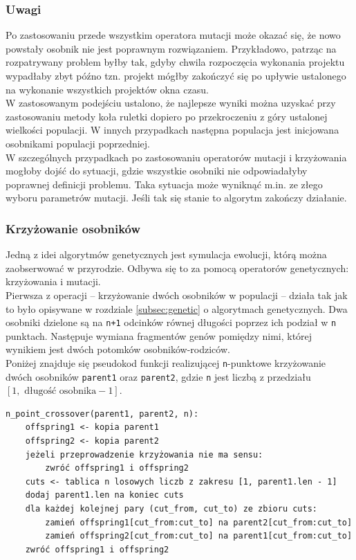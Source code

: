 \documentclass[12pt,a4paper]{article}
\theoremstyle{definition}
\begin{document}
\subsubsection*{Uwagi}
Po zastosowaniu przede wszystkim operatora mutacji może okazać się, że nowo powstały osobnik nie jest poprawnym rozwiązaniem. Przykładowo, patrząc na rozpatrywany problem byłby tak, gdyby chwila rozpoczęcia wykonania projektu wypadłaby zbyt późno tzn. projekt mógłby zakończyć się po upływie ustalonego na wykonanie wszystkich projektów okna czasu. \\

\noindent 
W zastosowanym podejściu ustalono, że najlepsze wyniki można uzyskać przy zastosowaniu metody koła ruletki dopiero po przekroczeniu z góry ustalonej wielkości populacji. W innych przypadkach następna populacja jest inicjowana osobnikami populacji poprzedniej. \\

\noindent
W szczególnych przypadkach po zastosowaniu operatorów mutacji i krzyżowania mogłoby dojść do sytuacji, gdzie wszystkie osobniki nie odpowiadałyby poprawnej definicji problemu. Taka sytuacja może wyniknąć m.in. ze złego wyboru parametrów mutacji. Jeśli tak się stanie to algorytm zakończy działanie.

\subsubsection{Krzyżowanie osobników}
Jedną z idei algorytmów genetycznych jest symulacja ewolucji, którą można zaobserwować w przyrodzie. Odbywa się to za pomocą operatorów genetycznych: krzyżowania i mutacji.\\

\noindent
Pierwsza z operacji -- krzyżowanie dwóch osobników w populacji -- działa tak jak to było opisywane w rozdziale \ref{subsec:genetic} o algorytmach genetycznych. Dwa osobniki dzielone są na \texttt{n+1} odcinków równej długości poprzez ich podział w \texttt{n} punktach. Następuje wymiana fragmentów genów pomiędzy nimi, której wynikiem jest dwóch potomków osobników-rodziców.\\

\noindent
Poniżej znajduje się pseudokod funkcji realizującej \texttt{n}-punktowe krzyżowanie dwóch osobników \texttt{parent1} oraz \texttt{parent2}, gdzie \texttt{n} jest liczbą z przedziału $[1, \text{ długość osobnika} - 1]$.\\

\begin{tcolorbox}[title=Krzyżowanie dwóch osobników]
\begin{verbatim}
n_point_crossover(parent1, parent2, n):
    offspring1 <- kopia parent1
    offspring2 <- kopia parent2
    jeżeli przeprowadzenie krzyżowania nie ma sensu:
        zwróć offspring1 i offspring2
    cuts <- tablica n losowych liczb z zakresu [1, parent1.len - 1]
    dodaj parent1.len na koniec cuts
    dla każdej kolejnej pary (cut_from, cut_to) ze zbioru cuts:
        zamień offspring1[cut_from:cut_to] na parent2[cut_from:cut_to]
        zamień offspring2[cut_from:cut_to] na parent1[cut_from:cut_to]
    zwróć offspring1 i offspring2
\end{verbatim}
\end{tcolorbox}
\end{document}
